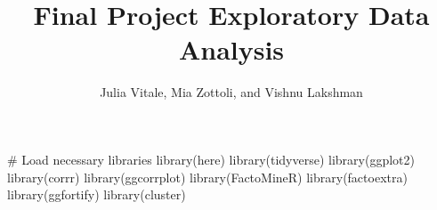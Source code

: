 \documentclass[
  letterpaper,
  DIV=11,
  numbers=noendperiod]{scrartcl}
\title{Final Project Exploratory Data Analysis}
\author{Julia Vitale, Mia Zottoli, and Vishnu Lakshman}
\date{}
\newenvironment{Shaded}{\begin{snugshade}}{\end{snugshade}}
\newcommand{\CommentTok}[1]{\textcolor[rgb]{0.37,0.37,0.37}{#1}}
\newcommand{\FunctionTok}[1]{\textcolor[rgb]{0.28,0.35,0.67}{#1}}
\newcommand{\NormalTok}[1]{\textcolor[rgb]{0.00,0.23,0.31}{#1}}
\begin{document}
\maketitle

\begin{Shaded}
\begin{Highlighting}[]
\CommentTok{\# Load necessary libraries}
\FunctionTok{library}\NormalTok{(here)}
\FunctionTok{library}\NormalTok{(tidyverse)}
\FunctionTok{library}\NormalTok{(ggplot2)}
\FunctionTok{library}\NormalTok{(corrr)}
\FunctionTok{library}\NormalTok{(ggcorrplot)}
\FunctionTok{library}\NormalTok{(FactoMineR)}
\FunctionTok{library}\NormalTok{(factoextra)}
\FunctionTok{library}\NormalTok{(ggfortify)}
\FunctionTok{library}\NormalTok{(cluster)}
\end{Highlighting}
\end{Shaded}
\end{document}
